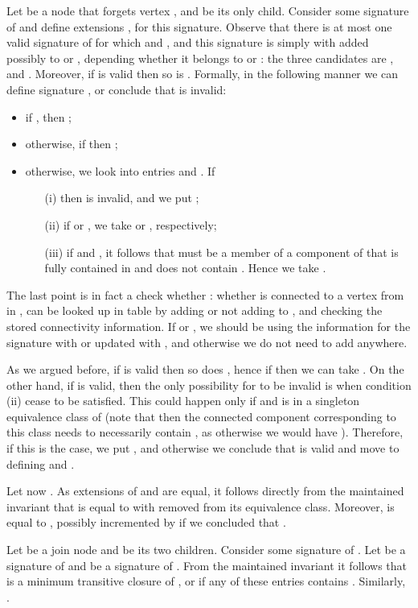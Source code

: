 \documentclass[a4paper,11pt]{article}
\theoremstyle{definition}
\theoremstyle{remark}
\begin{document}
 Let  be a node that forgets
vertex , and  be its only child.  Consider some signature
 of  and define extensions ,
 for this signature.  Observe that there is at most one
valid signature  of  for which
 and , and this
signature is simply  with  added possibly to  or ,
depending whether it belongs to  or : the
three candidates are ,
 and .
Moreover, if  is valid then so is .  Formally, in the
following manner we can define signature , or conclude that 
is invalid:
\begin{itemize}
\item if , then ;
\item otherwise, if  then ;
\item otherwise, we look into entries  and .  If
  \begin{itemize}
  \item[(i)]  then  is invalid, and we 
    put
    ;
  \item[(ii)] if  or , we take 
     or
    , respectively;
  \item[(iii)] if  and , it follows 
    that 
    must be a member of a component of  that
    is fully contained in  and does not contain .  Hence we
    take .
  \end{itemize}
\end{itemize}
The last point is in fact a check whether : whether 
is connected to a vertex from  in , can be looked up in
table  by adding or not adding  to , and checking the
stored connectivity information.  If  or , we should be using the information for the signature with
 or  updated with , and otherwise we do not need to add
 anywhere.

As we argued before, if  is valid then so does , hence if
 then we can take .
On the other hand, if  is valid, then the only possibility for
 to be invalid is when condition (ii) cease to be satisfied.
This could happen only if  and  is in a singleton
equivalence class of  (note that then the connected
component corresponding to this class needs to necessarily contain
, as otherwise we would have ).
Therefore, if this is the case, we put
, and otherwise we conclude that
 is valid and move to defining  and .

Let now .  As extensions of  and  are equal, it
follows directly from the maintained invariant that  is equal to
 with  removed from its equivalence class.  Moreover,
 is equal to , possibly incremented
by  if we concluded that .

\vskip 0.3cm

 Let  be a join node and
 be its two children.  Consider some signature
 of .  Let  be a signature of
 and  be a signature of .  From
the maintained invariant it follows that  is a minimum
transitive closure of , or 
if any of these entries contains .  Similarly,
.
\end{document}
